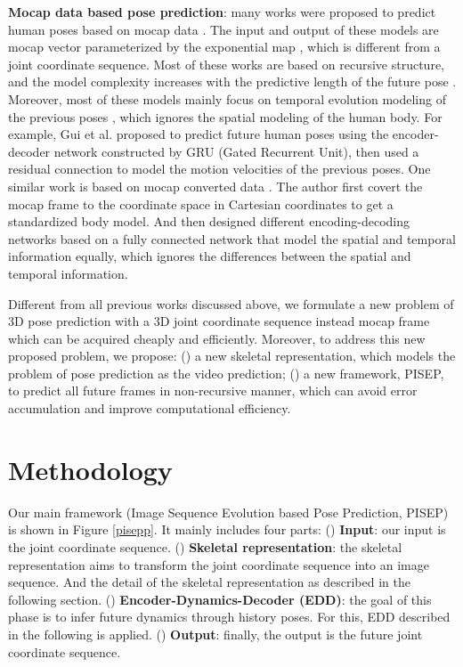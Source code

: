 \documentclass[journal]{IEEEtran}
\begin{document}
{\bf Mocap data based pose prediction}: many works were proposed to predict human poses based on mocap data \cite{ButepageDRL,Guifewshot,MartinezOMP,GuiAdversarial,TangLMP,tprnn,rnmhy,srnnap}. The input and output of these models are mocap vector parameterized by the exponential map \cite{TaylorMM,ppruem}, which is different from a joint coordinate sequence. Most of these works are based on recursive structure, and the model complexity increases with the predictive length of the future pose \cite{GuiAdversarial,TangLMP,rnmhy,srnnap,MartinezOMP,tprnn}. Moreover, most of these models mainly focus on temporal evolution modeling of the previous poses \cite{tprnn,MartinezOMP,rnmhy,srnnap}, which ignores the spatial modeling of the human body. For example, Gui et al.\cite{GuiAdversarial} proposed to predict future human poses using the encoder-decoder network constructed by GRU (Gated Recurrent Unit), then used a residual connection to model the motion velocities of the previous poses. One similar work is based on mocap converted data \cite{ButepageDRL}. The author first covert the mocap frame to the coordinate space in Cartesian coordinates to get a standardized body model. And then designed different encoding-decoding networks based on a fully connected network that model the spatial and temporal information equally, which ignores the differences between the spatial and temporal information.

Different from all previous works discussed above, we formulate a new problem of 3D pose prediction with a 3D joint coordinate sequence instead mocap frame which can be acquired cheaply and efficiently. Moreover, to address this new proposed problem, we propose: () a new skeletal representation, which models the problem of pose prediction as the video prediction; () a new framework, PISEP, to predict all future frames in non-recursive manner, which can avoid error accumulation and improve computational efficiency.


\section{Methodology}
Our main framework (Image Sequence Evolution based Pose Prediction, PISEP) is shown in Figure \ref{pisepp}. It mainly includes four parts: () {\bf Input}: our input is the joint coordinate sequence. () {\bf Skeletal representation}: the skeletal representation aims to transform the joint coordinate sequence into an image sequence. And the detail of the skeletal representation as described in the following section. () {\bf Encoder-Dynamics-Decoder (EDD)}: the goal of this phase is to infer future dynamics through history poses. For this, EDD described in the following is applied. () {\bf Output}: finally, the output is the future joint coordinate sequence.
\end{document}
